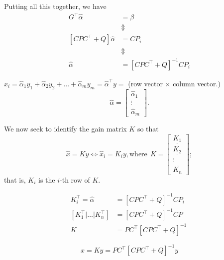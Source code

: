 \documentclass[letterpaper]{article}
\begin{document}
\newpage
Putting all this together, we have
\begin{align*}
G^\top \hat \alpha &= \beta \\
&\Updownarrow \\
[CPC^\top +Q] \hat \alpha &= C P_i \\
&\Updownarrow \\
\hat \alpha &= [CPC^\top +Q]^{-1} C P_i
\end{align*}


$\hat{x}_i = \hat \alpha_1 y_1  +  \hat \alpha_2 y_2  + \dots + \hat \alpha_m y_m = \hat \alpha^\top  y=$ (row vector $\times$ column vector.)
$$\hat \alpha =   \begin{bmatrix}
    \hat \alpha_1\\
    \vdots\\
    \hat \alpha_m
  \end{bmatrix}.$$

We now seek to identify the gain matrix $K$ so that
$$\hat x = Ky \Leftrightarrow \hat x_i = K_i y, \text{where}~~K =    \begin{bmatrix}
    \underline{K_1}\\
    \underline{K_2}\\
    \vdots\\
    \overline{K_n}
  \end{bmatrix};$$
  that is, $K_i$ is the $i$-th row of $K$.

  \begin{align*}
    K_i^\top  = \hat \alpha &=  [CPC^\top +Q]^{-1} C P_i\\
    [K_1^\top  | \dots | K_n^\top ] &= [CPC^\top +Q]^{-1} C P\\
    K&=PC^\top [CPC^\top +Q]^{-1}\
\end{align*}

$$\boxed{\hat{x} = K y =  PC^\top [CPC^\top +Q]^{-1}y}$$

\newpage
\end{document}
